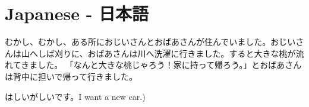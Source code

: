 \chapter{Japanese - 日本語}

むかし、むかし、ある所におじいさんとおばあさんが住んでいました。おじいさんは山へしば刈りに、おばあさんは川へ洗濯に行きました。すると大きな桃が流れてきました。
「なんと大きな桃じゃろう！家に持って帰ろう。」とおばあさんは背中に担いで帰って行きました。

はしいがしいです。I want a new car.)
